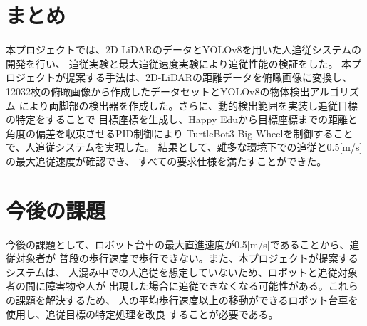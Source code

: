 \section{まとめ}
本プロジェクトでは、2D-LiDARのデータとYOLOv8を用いた人追従システムの開発を行い、
追従実験と最大追従速度実験により追従性能の検証をした。
本プロジェクトが提案する手法は、2D-LiDARの距離データを俯瞰画像に変換し、
12032枚の俯瞰画像から作成したデータセットとYOLOv8の物体検出アルゴリズム
により両脚部の検出器を作成した。さらに、動的検出範囲を実装し追従目標の特定をすることで
目標座標を生成し、Happy Eduから目標座標までの距離と角度の偏差を収束させるPID制御により
TurtleBot3 Big Wheelを制御することで、人追従システムを実現した。
結果として、雑多な環境下での追従と0.5[m/s]の最大追従速度が確認でき、
すべての要求仕様を満たすことができた。

\section{今後の課題}
今後の課題として、ロボット台車の最大直進速度が0.5[m/s]であることから、追従対象者が
普段の歩行速度で歩行できない。また、本プロジェクトが提案するシステムは、
人混み中での人追従を想定していないため、ロボットと追従対象者の間に障害物や人が
出現した場合に追従できなくなる可能性がある。これらの課題を解決するため、
人の平均歩行速度以上の移動ができるロボット台車を使用し、追従目標の特定処理を改良
することが必要である。
